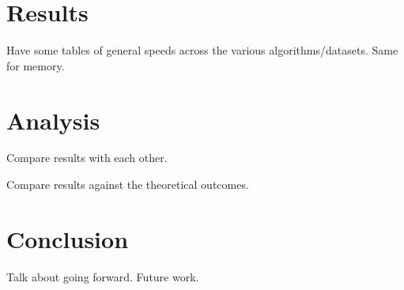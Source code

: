 \documentclass{article}
\begin{document}
\section{Results}
Have some tables of general speeds across the various algorithms/datasets. Same for memory.

\section{Analysis}
Compare results with each other.

Compare results against the theoretical outcomes.

\section{Conclusion}
Talk about going forward. Future work.
\nocite{*}




\end{document}
